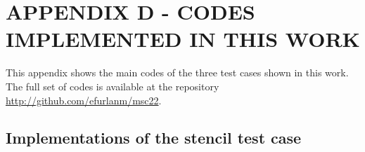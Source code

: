 \renewcommand{\thechapter}{D}
\chapter{APPENDIX D - CODES IMPLEMENTED IN THIS WORK}
\label{appendixD}

This appendix shows the main codes of the three test cases shown in this work. The full set of codes is available at the repository \url{http://github.com/efurlanm/msc22}.


%
%
%
%
%
%
%
\section{Implementations of the stencil test case}




